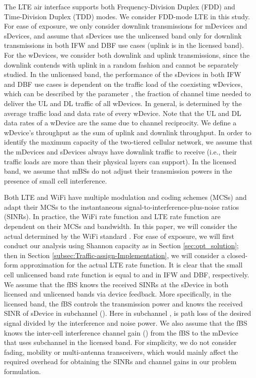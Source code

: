 \documentclass[journal,final,letterpaper,10pt,doublecolumn,twoside]{IEEEtran}
\begin{document}
The LTE air interface \cite{LTE-A} supports both Frequency-Division Duplex (FDD) and Time-Division Duplex (TDD) modes.
We consider FDD-mode LTE in this study. For ease of exposure, we only consider downlink transmissions for mDevices and sDevices, and assume that sDevices use the unlicensed band only for downlink transmissions in both IFW and DBF use cases (uplink is in the licensed band). For the wDevices, we consider both downlink and uplink transmissions, since the downlink contends with uplink in a random fashion and cannot be separately studied.
In the unlicensed band, the performance of the sDevices in both IFW and DBF use cases is dependent on the traffic load of the coexisting wDevices,
which can be described by the parameter , the fraction of
channel time needed to deliver the UL and DL traffic of all wDevices.
In general,  is determined by the  average traffic load
and data rate of every wDevice. Note that the UL and DL data rates of a wDevice are the same due to channel reciprocity.	 We define a wDevice’s throughput as the sum of uplink and downlink throughput. In order to identify the maximum capacity of the two-tiered cellular
network, we assume that the mDevices and sDevices always have downlink traffic to receive (i.e., their traffic loads are more than their physical layers can support).   In the licensed band, we assume that mBSs do not adjust their transmission powers
in the presence of small cell interference.

Both LTE and WiFi have multiple modulation and coding schemes (MCSs)
and adapt their MCSs to the instantaneous
signal-to-interference-plus-noise ratios (SINRs). In practice, the
WiFi rate function  and LTE rate function 
are dependent on their MCSs and bandwidth. In this paper, we will
consider the actual  determined by the WiFi standard
\cite{802.11-2007}. For ease of exposure, we will first conduct our
analysis using Shannon capacity as  in Section
\ref{sec:opt_solution}; then in Section
\ref{subsec:Traffic-assign-Implementation}, we will consider a
closed-form approximation for the actual LTE rate function.   It is
clear that the small cell unlicensed band rate function 
is equal to  and  in IFW and DBF,
respectively. We assume that the fBS knows the received SINRs at the
sDevice in both licensed and unlicensed bands via device feedback.
More specifically, in the licensed band, the fBS controls the transmission power  and knows the received SINR  of sDevice in subchannel  (). Here in subchannel ,   is  path loss of the desired signal divided by the interference and noise power.
We also assume that the fBS knows the inter-cell
interference channel gain  () from the
fBS to the mDevice that uses subchannel  in the licensed band. For
simplicity, we do not consider fading, mobility or multi-antenna
transceivers, which would mainly affect the required overhead for
obtaining the SINRs and channel gains in our problem formulation.
\end{document}
